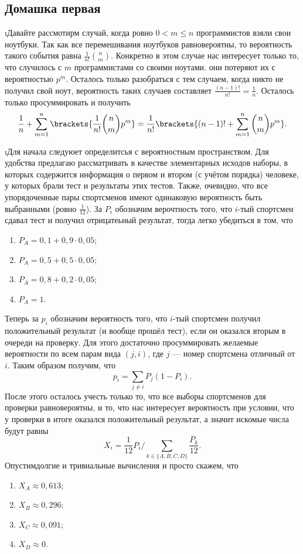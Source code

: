 \subsection{Домашка первая}

\i Давайте рассмотирм случай, когда ровно $0 < m \leq n$ программистов взяли свои ноутбуки. Так как все перемешивания ноутбуков равновероятны, то вероятность 
такого события равна $\frac{1}{n!}\binom{n}{m}$. Конкретно в этом случае нас интересует только то, что случилось с $m$ программистами со своими ноутами. они 
потеряют их с вероятностью $p^m$. Осталось только разобраться с тем случаем, когда никто не получил свой ноут, вероятность таких случаев составляет
 $\frac{(n-1)!}{n!} = \frac{1}{n}$. Осталось только просуммировать и получить 
 \[\frac{1}{n} + \sum_{m=1}^{n} \brackets{\frac{1}{n!}\binom{n}{m}p^m} = \frac{1}{n!}\brackets{(n-1)! + \sum_{m=1}^{n}\binom{n}{m}p^m}.\]

\i Для начала следуюет определитсья с вероятностным пространством. Для удобства предлагаю рассматривать в качестве элементарных исходов наборы, в которых
содержится информация о первом и втором (с учётом порядка) человеке, у которых брали тест и результаты этих тестов. Также, очевидно, что все упорядоченные
пары спортсменов имеют одинаковую вероятность быть выбранными (ровно $\frac{1}{12}$). За $P_i$ обозначим верочтность того, что $i$-тый спортсмен сдавал тест
и получил отрицатеьный результат, тогда легко убедиться в том, что 

\begin{enumerate}
    \item $P_A = 0{,}1 +  0{,}9 \cdot 0{,}05$;
    \item $P_A = 0{,}5 +  0{,}5 \cdot 0{,}05$;
    \item $P_A = 0{,}8 +  0{,}2 \cdot 0{,}05$;
    \item $P_A = 1$.
\end{enumerate}
Теперь за $p_i$ обозначим вероятность того, что $i$-тый спортсмен получил положительный результат (и вообще прошёл тест), если он оказался вторым в очереди на 
проверку. Для этого достаточно просуммировать желаемые вероятности по всем парам вида $(j, i)$, где $j$ --- номер спортсмена отличный от $i$. Таким образом 
получим, что 
\[p_i = \sum_{j \ne i} P_j (1-P_i).\]
После этого осталось учесть только то, что все выборы спортсменов для проверки равновероятны, и то, что нас интересует вероятность при условии, что у проверки 
в итоге оказался положительный результат, а значит искомые числа будут равны 
\[X_i = \frac{1}{12}P_i / \sum_{k \in \{A, B, C, D\}} \frac{P_k}{12} .\]
Опустимдолгие и тривиальные вычисления и просто скажем, что 
\begin{enumerate}
    \item $X_A \approx 0{,}613$;
    \item $X_B \approx 0{,}296$;
    \item $X_C \approx 0{,}091$;
    \item $X_D \approx 0$.
\end{enumerate}
